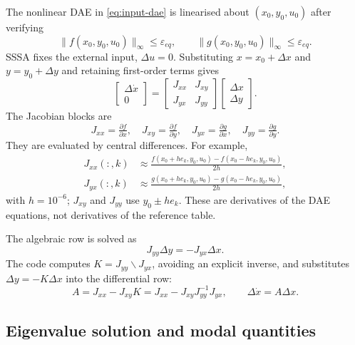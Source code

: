 \documentclass[12pt,a4paper]{article}
\begin{document}
The nonlinear DAE in \eqref{eq:input-dae} is linearised about
$(x_0,y_0,u_0)$ after verifying
\begin{equation}
\|f(x_0,y_0,u_0)\|_\infty\le\varepsilon_{eq},\qquad
\|g(x_0,y_0,u_0)\|_\infty\le\varepsilon_{eq}.
\end{equation}
SSSA fixes the external input, $\Delta u=0$. Substituting
$x=x_0+\Delta x$ and $y=y_0+\Delta y$ and retaining first-order terms gives
\begin{equation}
\begin{bmatrix}\Delta\dot x\\0\end{bmatrix}
=
\begin{bmatrix}J_{xx}&J_{xy}\\J_{yx}&J_{yy}\end{bmatrix}
\begin{bmatrix}\Delta x\\\Delta y\end{bmatrix}.
\label{eq:sssa-linear-dae}
\end{equation}
The Jacobian blocks are
\begin{equation}
J_{xx}=\tfrac{\partial f}{\partial x},\quad
J_{xy}=\tfrac{\partial f}{\partial y},\quad
J_{yx}=\tfrac{\partial g}{\partial x},\quad
J_{yy}=\tfrac{\partial g}{\partial y}.
\end{equation}
They are evaluated by central differences. For example,
\begin{align}
J_{xx}(:,k)&\approx
\frac{f(x_0+h e_k,y_0,u_0)-f(x_0-h e_k,y_0,u_0)}{2h},\\
J_{yx}(:,k)&\approx
\frac{g(x_0+h e_k,y_0,u_0)-g(x_0-h e_k,y_0,u_0)}{2h},
\end{align}
with $h=10^{-6}$; $J_{xy}$ and $J_{yy}$ use $y_0\pm h e_k$. These are
derivatives of the DAE equations, not derivatives of the reference table.

The algebraic row is solved as
\begin{equation}
J_{yy}\Delta y=-J_{yx}\Delta x.
\end{equation}
The code computes $K=J_{yy}\backslash J_{yx}$, avoiding an explicit inverse,
and substitutes $\Delta y=-K\Delta x$ into the differential row:
\begin{equation}
A=J_{xx}-J_{xy}K
=J_{xx}-J_{xy}J_{yy}^{-1}J_{yx},\qquad
\Delta\dot x=A\Delta x.
\label{eq:sssa-schur}
\end{equation}

\subsection{Eigenvalue solution and modal quantities}
\end{document}
